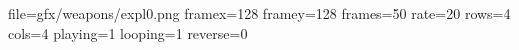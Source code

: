 file=gfx/weapons/expl0.png
framex=128
framey=128
frames=50
rate=20
rows=4
cols=4
playing=1
looping=1
reverse=0
